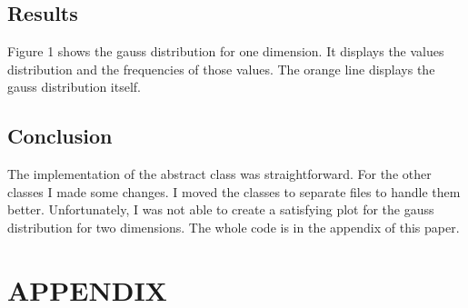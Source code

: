 \documentclass[10pt, a4paper, twocolumn]{article} %
\begin{document}
\subsection{Results}
Figure 1 shows the gauss distribution for one dimension. It displays the values distribution and the frequencies of those values. The orange line displays the gauss distribution itself.


\subsection{Conclusion}
The implementation of the abstract class was straightforward. For the other classes I made some changes. I moved the classes to separate files to handle them better. Unfortunately, I was not able to create a satisfying plot for the gauss distribution for two dimensions. The whole code is in the appendix of this paper. 


\printbibliography[title={Bibliography}] %


\section*{APPENDIX}
\end{document}
